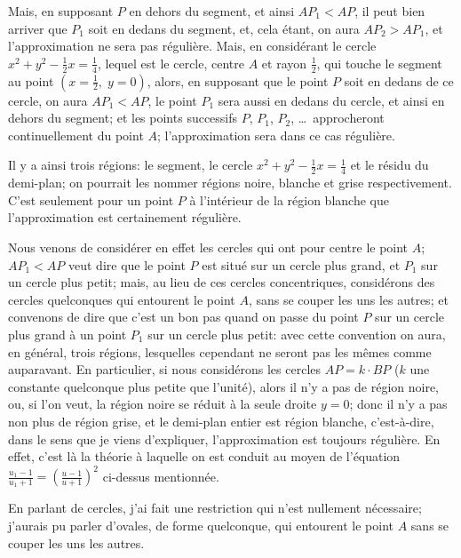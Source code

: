 \documentclass[11pt,a4paper]{article}
\theoremstyle{plain}
\begin{document}
Mais, en supposant $P$ en dehors du segment, et ainsi $AP_1 < AP$, il peut bien arriver que $P_1$ soit en dedans du segment, et, cela \'etant, on aura $AP_2 > AP_1$, et l'approximation ne sera pas r\'eguli\`ere. Mais, en consid\'erant le cercle $x^2 + y^2 - \frac{1}{2}x = \frac{1}{4}$, lequel est le cercle, centre $A$ et rayon $\frac{1}{2}$, qui touche le segment au point $(x = \frac{1}{2},\; y = 0)$, alors, en supposant que le point $P$ soit en dedans de ce cercle, on aura $AP_1 < AP$, le point $P_1$ sera aussi en dedans du cercle, et ainsi en dehors du segment; et les points successifs $P$, $P_1$, $P_2$, \ldots\ approcheront continuellement du point $A$; l'approximation sera dans ce cas r\'eguli\`ere.

Il y a ainsi trois r\'egions: le segment, le cercle $x^2 + y^2 - \frac{1}{2}x = \frac{1}{4}$ et le r\'esidu du demi-plan; on pourrait les nommer r\'egions noire, blanche et grise respectivement. C'est seulement pour un point $P$ \`a l'int\'erieur de la r\'egion blanche que l'approximation est certainement r\'eguli\`ere.

Nous venons de consid\'erer en effet les cercles qui ont pour centre le point $A$; $AP_1 < AP$ veut dire que le point $P$ est situ\'e sur un cercle plus grand, et $P_1$ sur un cercle plus petit; mais, au lieu de ces cercles concentriques, consid\'erons des cercles quelconques qui entourent le point $A$, sans se couper les uns les autres; et convenons de dire que c'est un bon pas quand on passe du point $P$ sur un cercle plus grand \`a un point $P_1$ sur un cercle plus petit: avec cette convention on aura, en g\'en\'eral, trois r\'egions, lesquelles cependant ne seront pas les m\^emes comme auparavant. En particulier, si nous consid\'erons les cercles $AP = k \cdot BP$ ($k$ une constante quelconque plus petite que l'unit\'e), alors il n'y a pas de r\'egion noire, ou, si l'on veut, la r\'egion noire se r\'eduit \`a la seule droite $y = 0$; donc il n'y a pas non plus de r\'egion grise, et le demi-plan entier est r\'egion blanche, c'est-\`a-dire, dans le sens que je viens d'expliquer, l'approximation est toujours r\'eguli\`ere. En effet, c'est l\`a la th\'eorie \`a laquelle on est conduit au moyen de l'\'equation $\frac{u_1 - 1}{u_1 + 1} = \left(\frac{u - 1}{u + 1}\right)^2$ ci-dessus mentionn\'ee.

En parlant de cercles, j'ai fait une restriction qui n'est nullement n\'ecessaire; j'aurais pu parler d'ovales, de forme quelconque, qui entourent le point $A$ sans se couper les uns les autres.
\end{document}
